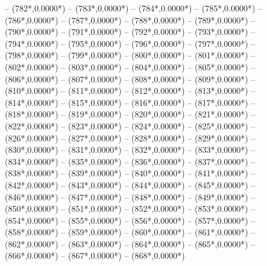 {		-- ({782*\dx},{0.0000*\dy})
		-- ({783*\dx},{0.0000*\dy})
		-- ({784*\dx},{0.0000*\dy})
		-- ({785*\dx},{0.0000*\dy})
		-- ({786*\dx},{0.0000*\dy})
		-- ({787*\dx},{0.0000*\dy})
		-- ({788*\dx},{0.0000*\dy})
		-- ({789*\dx},{0.0000*\dy})
		-- ({790*\dx},{0.0000*\dy})
		-- ({791*\dx},{0.0000*\dy})
		-- ({792*\dx},{0.0000*\dy})
		-- ({793*\dx},{0.0000*\dy})
		-- ({794*\dx},{0.0000*\dy})
		-- ({795*\dx},{0.0000*\dy})
		-- ({796*\dx},{0.0000*\dy})
		-- ({797*\dx},{0.0000*\dy})
		-- ({798*\dx},{0.0000*\dy})
		-- ({799*\dx},{0.0000*\dy})
		-- ({800*\dx},{0.0000*\dy})
		-- ({801*\dx},{0.0000*\dy})
		-- ({802*\dx},{0.0000*\dy})
		-- ({803*\dx},{0.0000*\dy})
		-- ({804*\dx},{0.0000*\dy})
		-- ({805*\dx},{0.0000*\dy})
		-- ({806*\dx},{0.0000*\dy})
		-- ({807*\dx},{0.0000*\dy})
		-- ({808*\dx},{0.0000*\dy})
		-- ({809*\dx},{0.0000*\dy})
		-- ({810*\dx},{0.0000*\dy})
		-- ({811*\dx},{0.0000*\dy})
		-- ({812*\dx},{0.0000*\dy})
		-- ({813*\dx},{0.0000*\dy})
		-- ({814*\dx},{0.0000*\dy})
		-- ({815*\dx},{0.0000*\dy})
		-- ({816*\dx},{0.0000*\dy})
		-- ({817*\dx},{0.0000*\dy})
		-- ({818*\dx},{0.0000*\dy})
		-- ({819*\dx},{0.0000*\dy})
		-- ({820*\dx},{0.0000*\dy})
		-- ({821*\dx},{0.0000*\dy})
		-- ({822*\dx},{0.0000*\dy})
		-- ({823*\dx},{0.0000*\dy})
		-- ({824*\dx},{0.0000*\dy})
		-- ({825*\dx},{0.0000*\dy})
		-- ({826*\dx},{0.0000*\dy})
		-- ({827*\dx},{0.0000*\dy})
		-- ({828*\dx},{0.0000*\dy})
		-- ({829*\dx},{0.0000*\dy})
		-- ({830*\dx},{0.0000*\dy})
		-- ({831*\dx},{0.0000*\dy})
		-- ({832*\dx},{0.0000*\dy})
		-- ({833*\dx},{0.0000*\dy})
		-- ({834*\dx},{0.0000*\dy})
		-- ({835*\dx},{0.0000*\dy})
		-- ({836*\dx},{0.0000*\dy})
		-- ({837*\dx},{0.0000*\dy})
		-- ({838*\dx},{0.0000*\dy})
		-- ({839*\dx},{0.0000*\dy})
		-- ({840*\dx},{0.0000*\dy})
		-- ({841*\dx},{0.0000*\dy})
		-- ({842*\dx},{0.0000*\dy})
		-- ({843*\dx},{0.0000*\dy})
		-- ({844*\dx},{0.0000*\dy})
		-- ({845*\dx},{0.0000*\dy})
		-- ({846*\dx},{0.0000*\dy})
		-- ({847*\dx},{0.0000*\dy})
		-- ({848*\dx},{0.0000*\dy})
		-- ({849*\dx},{0.0000*\dy})
		-- ({850*\dx},{0.0000*\dy})
		-- ({851*\dx},{0.0000*\dy})
		-- ({852*\dx},{0.0000*\dy})
		-- ({853*\dx},{0.0000*\dy})
		-- ({854*\dx},{0.0000*\dy})
		-- ({855*\dx},{0.0000*\dy})
		-- ({856*\dx},{0.0000*\dy})
		-- ({857*\dx},{0.0000*\dy})
		-- ({858*\dx},{0.0000*\dy})
		-- ({859*\dx},{0.0000*\dy})
		-- ({860*\dx},{0.0000*\dy})
		-- ({861*\dx},{0.0000*\dy})
		-- ({862*\dx},{0.0000*\dy})
		-- ({863*\dx},{0.0000*\dy})
		-- ({864*\dx},{0.0000*\dy})
		-- ({865*\dx},{0.0000*\dy})
		-- ({866*\dx},{0.0000*\dy})
		-- ({867*\dx},{0.0000*\dy})
		-- ({868*\dx},{0.0000*\dy})
}
